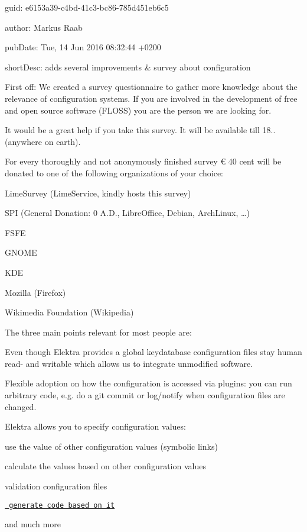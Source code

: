 
\begin{DoxyItemize}
\item guid\+: e6153a39-\/c4bd-\/41c3-\/bc86-\/785d451eb6c5
\item author\+: Markus Raab
\item pub\+Date\+: Tue, 14 Jun 2016 08\+:32\+:44 +0200
\item short\+Desc\+: adds several improvements \& survey about configuration
\end{DoxyItemize}

First off\+: We created a survey questionnaire to gather more knowledge about the relevance of configuration systems. If you are involved in the development of free and open source software (F\+L\+O\+SS) you are the person we are looking for.

It would be a great help if you take this survey. It will be available till 18.. (anywhere on earth).

For every thoroughly and not anonymously finished survey € 40 cent will be donated to one of the following organizations of your choice\+:


\begin{DoxyItemize}
\item Lime\+Survey (Lime\+Service, kindly hosts this survey)
\item S\+PI (General Donation\+: 0 A.\+D., Libre\+Office, Debian, Arch\+Linux, …)
\item F\+S\+FE
\item G\+N\+O\+ME
\item K\+DE
\item Mozilla (Firefox)
\item Wikimedia Foundation (Wikipedia)
\end{DoxyItemize}

The three main points relevant for most people are\+:


\begin{DoxyEnumerate}
\item Even though Elektra provides a global keydatabase configuration files stay human read-\/ and writable which allows us to integrate unmodified software.
\item Flexible adoption on how the configuration is accessed via plugins\+: you can run arbitrary code, e.\+g. do a {\ttfamily git commit} or log/notify when configuration files are changed.
\item Elektra allows you to specify configuration values\+:
\begin{DoxyItemize}
\item use the value of other configuration values (symbolic links)
\item calculate the values based on other configuration values
\item validation configuration files
\item \href{https://master.libelektra.org/src/tools/pythongen}{\texttt{ generate code based on it}}
\item and much more
\end{DoxyItemize}
\end{DoxyEnumerate}

